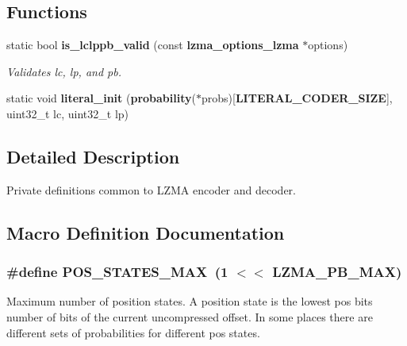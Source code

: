 \subsection*{Functions}
\begin{DoxyCompactItemize}
\item 
static bool {\bf is\-\_\-lclppb\-\_\-valid} (const {\bf lzma\-\_\-options\-\_\-lzma} $\ast$options)
\begin{DoxyCompactList}\small\item\em Validates lc, lp, and pb. \end{DoxyCompactList}\item 
static void {\bfseries literal\-\_\-init} ({\bf probability}($\ast$probs)[{\bf L\-I\-T\-E\-R\-A\-L\-\_\-\-C\-O\-D\-E\-R\-\_\-\-S\-I\-Z\-E}], uint32\-\_\-t lc, uint32\-\_\-t lp)\label{lzma__common_8h_aa08e52ba6f25a872abac5c7055400412}

\end{DoxyCompactItemize}


\subsection{Detailed Description}
Private definitions common to L\-Z\-M\-A encoder and decoder. 

\subsection{Macro Definition Documentation}
\subsubsection[{P\-O\-S\-\_\-\-S\-T\-A\-T\-E\-S\-\_\-\-M\-A\-X}]{\setlength{\rightskip}{0pt plus 5cm}\#define P\-O\-S\-\_\-\-S\-T\-A\-T\-E\-S\-\_\-\-M\-A\-X~(1 $<$$<$ L\-Z\-M\-A\-\_\-\-P\-B\-\_\-\-M\-A\-X)}\label{lzma__common_8h_a745eda4922193007c4b894dd75330549}
Maximum number of position states. A position state is the lowest pos bits number of bits of the current uncompressed offset. In some places there are different sets of probabilities for different pos states. 
